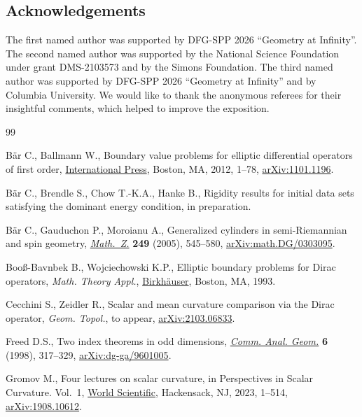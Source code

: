 \documentclass[pdftex]{sigma}
\numberwithin{equation}{section}
\begin{document}
\subsection*{Acknowledgements}

The first named author was supported by DFG-SPP 2026 ``Geometry at Infinity''.
The second named author was supported by the National Science Foundation under grant DMS-2103573 and by the Simons Foundation.
The third named author was supported by DFG-SPP 2026 ``Geometry at Infinity'' and by Columbia University.
We would like to thank the anonymous referees for their insightful comments, which helped to improve the exposition.

\begin{thebibliography}{99}
\footnotesize\itemsep=0pt

B\"ar C., Ballmann W., Boundary value problems for elliptic differential
 operators of first order, \href{https://doi.org/10.4310/SDG.2012.v17.n1.a1}{International Press}, Boston, MA, 2012, 1--78,
 \href{https://arxiv.org/abs/1101.1196}{arXiv:1101.1196}.

B\"ar C., Brendle S., Chow T.-K.A., Hanke B., Rigidity results for initial data
 sets satisfying the dominant energy condition, {i}n preparation.

B\"ar C., Gauduchon P., Moroianu A., Generalized cylinders in semi-{R}iemannian
 and spin geometry, \href{https://doi.org/10.1007/s00209-004-0718-0}{\textit{Math.~Z.}} \textbf{249} (2005), 545--580,
 \href{https://arxiv.org/abs/math.DG/0303095}{arXiv:math.DG/0303095}.

Boo{\ss}-Bavnbek B., Wojciechowski K.P., Elliptic boundary problems for {D}irac
 operators, \textit{Math. Theory Appl.}, \href{https://doi.org/10.1007/978-1-4612-0337-7}{Birkh\"auser}, Boston, MA, 1993.

Cecchini S., Zeidler R., Scalar and mean curvature comparison via the Dirac
 operator, \textit{Geom. Topol.}, {t}o appear, \href{https://arxiv.org/abs/2103.06833}{arXiv:2103.06833}.

Freed D.S., Two index theorems in odd dimensions, \href{https://doi.org/10.4310/CAG.1998.v6.n2.a4}{\textit{Comm. Anal. Geom.}}
 \textbf{6} (1998), 317--329, \href{https://arxiv.org/abs/dg-ga/9601005}{arXiv:dg-ga/9601005}.

Gromov M., Four lectures on scalar curvature, in Perspectives in {S}calar
 {C}urvature. {V}ol.~1, \href{https://doi.org/10.1142/9789811273223_0001}{World Scientific}, Hackensack, NJ, 2023, 1--514,
 \href{https://arxiv.org/abs/1908.10612}{arXiv:1908.10612}.


\end{thebibliography}
\end{document}
